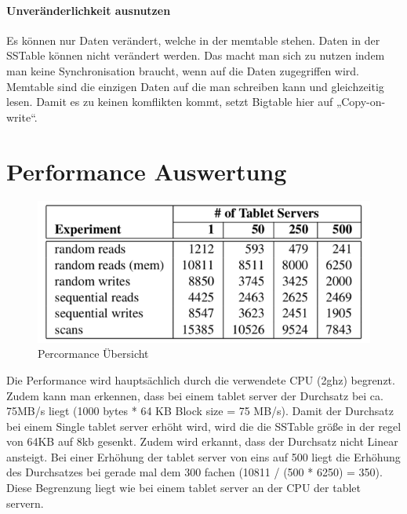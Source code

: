 \paragraph{Unveränderlichkeit ausnutzen}
Es können nur Daten verändert, welche in der memtable stehen. Daten in der SSTable können nicht verändert werden. Das macht man sich zu nutzen indem man keine Synchronisation braucht, wenn auf die Daten zugegriffen wird. Memtable sind die einzigen Daten auf die man schreiben kann und gleichzeitig lesen. Damit es zu keinen komflikten kommt, setzt Bigtable hier auf „Copy-on-write“. 

\section{Performance Auswertung}
\begin{figure}[!htpb]
	\centering
	\includegraphics[]{pics/bigtable_performance.png}
	\caption {Percormance Übersicht}	
\end{figure}
Die Performance wird hauptsächlich durch die verwendete CPU (2ghz) begrenzt. Zudem kann man erkennen, dass bei einem tablet server der Durchsatz bei ca. 75MB/s liegt (1000 bytes * 64 KB Block size = 75 MB/s). Damit der Durchsatz bei einem Single tablet server erhöht wird, wird die die SSTable größe in der regel von 64KB auf 8kb gesenkt. 
Zudem wird erkannt, dass der Durchsatz nicht Linear ansteigt. Bei einer Erhöhung der tablet server von eins auf 500 liegt die Erhöhung des Durchsatzes bei gerade mal dem 300 fachen (10811 / (500 * 6250) = 350). Diese Begrenzung liegt wie bei einem tablet server an der CPU der tablet servern.
